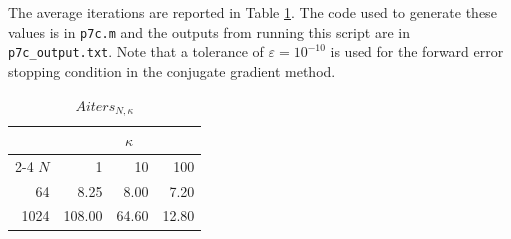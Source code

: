 \documentclass{homework}
\begin{document}
\begin{alphaparts}
		\questionpart The average iterations are reported in Table \ref{table:p7c}. The code used to generate these values is in \texttt{p7c.m} and the outputs from running this script are in \texttt{p7c\_output.txt}. Note that a tolerance of $\varepsilon = 10^{-10}$ is used for the forward error stopping condition in the conjugate gradient method.
		
		\begin{table}[htb!]
			\centering
			\begin{tabular}{@{}rrrr@{}}
				\toprule
				& \multicolumn{3}{c}{$\kappa$} \\
				\cmidrule(ll){2-4}
				$N$ & 1 & 10 & 100 \\
				\midrule
				64 & 8.25 & 8.00 & 7.20 \\
				1024 & 108.00 & 64.60 & 12.80 \\
				\bottomrule
			\end{tabular}
			\caption{$Aiters_{N,\kappa}$}
			\label{table:p7c}
		\end{table}
	\end{alphaparts}
\end{document}

